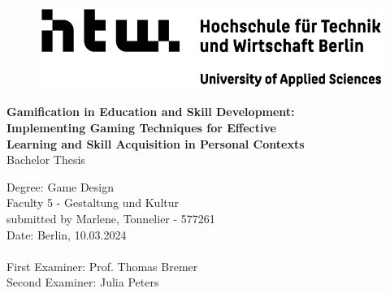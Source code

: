 \thispagestyle{empty}
\addtocounter{page}{-1}

\begin{figure}[t!]
    \includegraphics{figures/HTW_Logo}
\end{figure}

\mbox{}
\vfill
\vspace{3cm}
\large
\noindent
\textbf{Gamification in Education and Skill Development:\\Implementing Gaming Techniques for Effective\\Learning and Skill Acquisition in Personal Contexts}\\

\normalsize
\noindent
Bachelor Thesis

\vspace{0.6cm}
\small
\noindent
Degree: Game Design\\
Faculty 5 - Gestaltung und Kultur\\

\mbox{}
\vfill
\noindent
submitted by Marlene, Tonnelier - 577261\\
Date: Berlin, 10.03.2024\\
\\
\noindent
First Examiner: Prof. Thomas Bremer\\
Second Examiner: Julia Peters

\restoregeometry